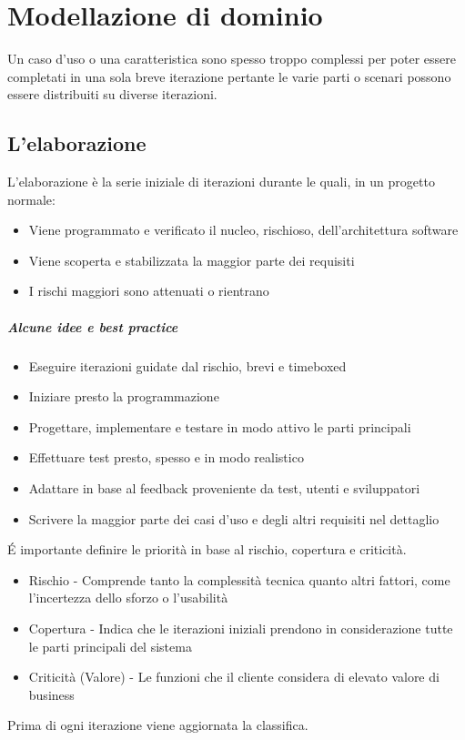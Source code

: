 \chapter{Modellazione di dominio}
Un caso d'uso o una caratteristica sono spesso troppo
complessi per poter essere completati in una sola breve iterazione
pertante le varie parti o scenari possono essere distribuiti su diverse iterazioni.

\section{L'elaborazione}
L'elaborazione è la serie iniziale di iterazioni durante le quali, in un progetto
normale:
\begin{itemize}
    \item Viene programmato e verificato il nucleo, rischioso, dell'architettura software
    \item Viene scoperta e stabilizzata la maggior parte dei requisiti
    \item I rischi maggiori sono attenuati o rientrano
\end{itemize}
\paragraph*{Alcune idee e best practice}
\begin{itemize}
    \item Eseguire iterazioni guidate dal rischio, brevi e timeboxed
    \item Iniziare presto la programmazione
    \item Progettare, implementare e testare in modo attivo le parti principali
    \item Effettuare test presto, spesso e in modo realistico
    \item Adattare in base al feedback proveniente da test, utenti e sviluppatori
    \item Scrivere la maggior parte dei casi d'uso e degli altri requisiti nel dettaglio
\end{itemize}
\'E importante definire le priorità in base al rischio, copertura e criticità.
\begin{itemize}
    \item Rischio - Comprende tanto la complessità tecnica quanto altri fattori,
    come l'incertezza dello sforzo o l'usabilità
    \item Copertura - Indica che le iterazioni iniziali prendono in considerazione tutte
    le parti principali del sistema
    \item Criticità (Valore) - Le funzioni che il cliente considera di elevato
    valore di business
\end{itemize}
Prima di ogni iterazione viene aggiornata la classifica.
